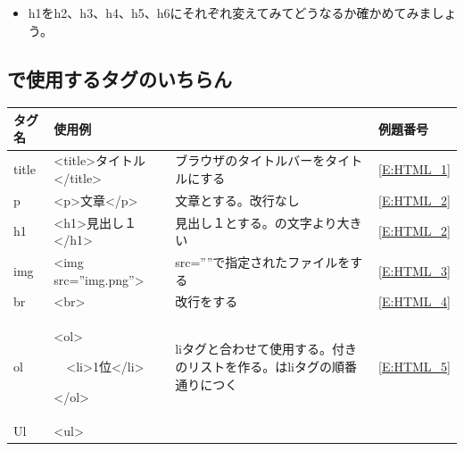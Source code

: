 \documentclass[a4paper,12pt]{jarticle}
\begin{document}
\vfill

\theQuestion\label{Q:hasAnswer04-2}

\begin{itemize}
  \item[]
    h1をh2、h3、h4、h5、h6にそれぞれ変えてみてどうなるか確かめてみましょう。
\end{itemize}

\bigskip

\clearpage\subsection{で使用するタグのいちらん}
{\small
  \begin{center}
    \tablefirsthead{}
    \tablehead{}
    \tabletail{}
    \tablelasttail{}
    \begin{supertabular}{|m{1.6cm}|m{5.1060004cm}|m{7.8930006cm}|m{2.037cm}|}
      \hline
      タグ名 &
      使用例 &
       &
      例題番号\\\hline
      title &
      {\textless}title{\textgreater}タイトル{\textless}/title{\textgreater} &
      ブラウザのタイトルバーをタイトルにする
      &
      \ref*{E:HTML_1}\\\hline
      p &
      {\textless}p{\textgreater}文章{\textless}/p{\textgreater} &
      文章とする。改行なし &
      \ref*{E:HTML_2}\\\hline
      h1 &
      {\textless}h1{\textgreater}見出し１{\textless}/h1{\textgreater} &
      見出し１とする。の文字より大きい
      &
      \ref*{E:HTML_2}\\\hline
      img &
      {\textless}img src=”img.png”{\textgreater} &
      src=””で指定されたファイルをする
      &
      \ref*{E:HTML_3}\\\hline
      br &
      {\textless}br{\textgreater} &
      改行をする &
      \ref*{E:HTML_4}\\\hline
      ol &
      {\textless}ol{\textgreater}

      \ \ {\textless}li{\textgreater}1位{\textless}/li{\textgreater}

      {\textless}/ol{\textgreater} &
      liタグと合わせて使用する。付きのリストを作る。はliタグの順番通りにつく
      &
      \ref*{E:HTML_5}\\\hline
      Ul &
      {\textless}ul{\textgreater}


\end{supertabular}
\end{center}}
\end{document}
